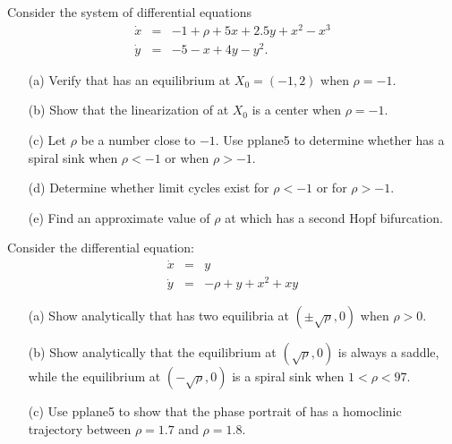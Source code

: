 \begin{exercise} \label{c9.7.4}
Consider the system of differential equations
\begin{equation*}  \label{E:hbifex}
\begin{array}{rcl}
\dot{x} & = & -1 + \rho + 5x + 2.5y + x^2 - x^3 \\
\dot{y} & = & -5 - x + 4y - y^2.  \end{array}
\end{equation*}
\begin{itemize}
\item[(a)]  Verify that  has an equilibrium at $X_0=(-1,2)$ 
when $\rho=-1$.
\item[(b)]  Show that the linearization of  at $X_0$ is a 
center when $\rho=-1$.  
\item[(c)]  Let $\rho$ be a number close to $-1$.  Use {\sf pplane5} to 
determine whether  has a spiral sink when $\rho<-1$ or when 
$\rho>-1$.  
\item[(d)]  Determine whether limit cycles exist for $\rho<-1$ or for 
$\rho>-1$.
\item[(e)]  Find an approximate value of $\rho$ at which 
has a second Hopf bifurcation.
\end{itemize} 
\end{exercise}

\begin{exercise} \label{c9.7.5}
Consider the differential equation:
\begin{equation*} \label{e:homo}
\begin{array}{rcl}
\dot{x} & = &  y \\
\dot{y} & = &  -\rho + y + x^2 + xy
\end{array}
\end{equation*}
\begin{itemize}
\item[(a)]  Show analytically that  has two equilibria at 
$(\pm\sqrt{\rho},0)$ when $\rho>0$. 
\item[(b)]  Show analytically that the equilibrium at $(\sqrt{\rho},0)$ is 
always a saddle, while the equilibrium at $(-\sqrt{\rho},0)$ is a spiral sink 
when $1<\rho<97$.  
\item[(c)]  Use {\sf pplane5} to show that the phase portrait of  
has a homoclinic trajectory between $\rho=1.7$ and $\rho=1.8$.  
\end{itemize}
\end{exercise}

